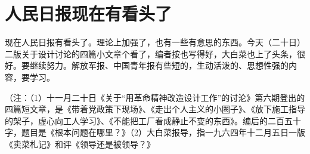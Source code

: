\section[人民日报现在有看头了（一九六四年十二月二十日）]{人民日报现在有看头了}


现在人民日报有看头了。理论上加强了，也有一些有意思的东西。今天（二十日）二版关于设计讨论的四篇小文章个看了，编者按也写得好，大白菜也上了头条，很好。要继续努力。解放军报、中国青年报有些短的，生动活泼的、思想性强的内容，要学习。

（注：（1）十一月二十日《关于“用革命精神改造设计工作”的讨沦》第六期登出的四篇短文章，是《带着党政策下现场》、《走出个人主义的小圈子》、《放下施工指导的架子，虚心向工人学习》、《不能把工厂看成静止不变的东西》。编后的二百五十字，题目是《根本问题在哪里？》（2）大白菜报导，指一九六四年十二月五日一版《卖菜札记》和评《领导还是被领导？》


